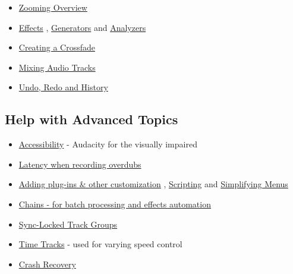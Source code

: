 \begin{multicols}{2}
\begin{itemize}
\item 
\hyperref[\foo{man_zooming_}]{Zooming Overview}

\item 
\hyperref[\foo{man_index_of_effects_generators_and_analyzers_}]{Effects}
, 
\hyperref[\foo{man_index_of_effects_generators_and_analyzers_generators}]{Generators}
 and 
\hyperref[\foo{man_index_of_effects_generators_and_analyzers_analyzers}]{Analyzers}

\item 
\hyperref[\foo{man_creating_a_crossfade_}]{Creating a Crossfade}

\item 
\hyperref[\foo{man_mixing_}]{Mixing Audio Tracks}

\item 
\hyperref[\foo{man_undo_redo_and_history_}]{Undo, Redo and History}

\end{itemize}

\subsection{Help with Advanced Topics}
\begin{itemize}
\item 
\hyperref[\foo{man_accessibility_}]{Accessibility}
 - Audacity for the visually impaired 
\item 
\hyperref[\foo{man_latency_test_}]{Latency when recording overdubs}

\item 
\hyperref[\foo{man_customization_}]{Adding plug-ins & other customization}
, 
\hyperref[\foo{man_scripting_}]{Scripting}
 and 
\hyperref[\foo{man_simplifying_audacity_}]{Simplifying Menus}

\item 
\hyperref[\foo{man_chains_for_batch_processing_and_effects_automation_}]{Chains - for batch processing and effects automation}

\item 
\hyperref[\foo{man_sync_locked_track_groups_}]{Sync-Locked Track Groups}

\item 
\hyperref[\foo{man_time_tracks_}]{Time Tracks}
 - used for varying speed control
\item 
\hyperref[\foo{man_recovery_}]{Crash Recovery}

\end{itemize}

\label{index_bottom_using}
\label{index_misc}

\end{multicols}
